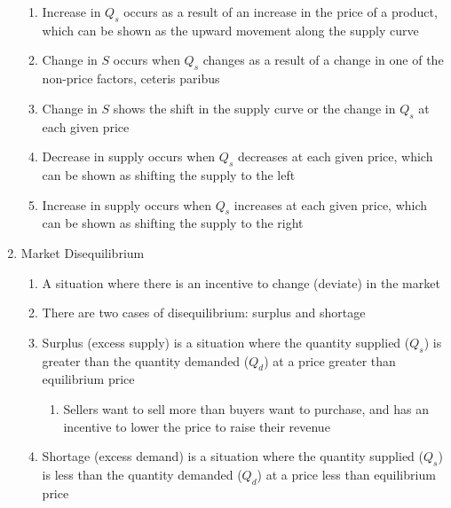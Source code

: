 \documentclass[12pt]{article}
\begin{document}
\begin{enumerate}
\begin{enumerate}
          \item Increase in $Q_s$ occurs as a result of an increase in the price of a product, which can be shown as the upward movement along the supply curve

          \item Change in $S$ occurs when $Q_s$ changes as a result of a change in one of the non-price factors, ceteris paribus

          \item Change in $S$ shows the shift in the supply curve or the change in $Q_s$ at each given price

          \item Decrease in supply occurs when $Q_s$ decreases at each given price, which can be shown as shifting the supply to the left

          \item Increase in supply occurs when $Q_s$ increases at each given price, which can be shown as shifting the supply to the right

        \end{enumerate}

      \item Market Disequilibrium

        \begin{enumerate}

          \item A situation where there is an incentive to change (deviate) in the market

          \item There are two cases of disequilibrium: surplus and shortage

          \item Surplus (excess supply) is a situation where the quantity supplied ($Q_s$) is greater than the quantity demanded ($Q_d$) at a price greater than equilibrium price

            \begin{enumerate}

              \item Sellers want to sell more than buyers want to purchase, and has an incentive to lower the price to raise their revenue

            \end{enumerate}

          \item Shortage (excess demand) is a situation where the quantity supplied ($Q_s$) is less than the quantity demanded ($Q_d$) at a price less than equilibrium price


\end{enumerate}
\end{enumerate}
\end{document}
